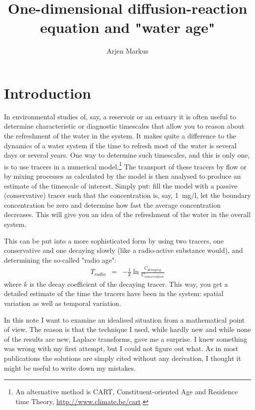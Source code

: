 \documentclass[onecolumn]{article}
\begin{document}
\title{One-dimensional diffusion-reaction equation and "water age"}

\author{Arjen Markus}

\maketitle

\section*{Introduction}
In environmental studies of, say, a reservoir or an estuary it is often useful to determine characteristic or diagnostic
timescales that allow you to reason about the refreshment of the water in the system. It makes quite a difference to
the dynamics of a water system if the time to refresh most of the water is several days or several years. One way to
determine such timescales, and this is only one, is to use tracers in a numerical model.\footnote{An alternative
method is CART, Constituent-oriented Age and Residence time Theory, \url{http://www.climate.be/cart}.}
 The transport of these
tracers by flow or by mixing processes as calculated by the model is then analysed to produce an estimate of the timescale
of interest. Simply put: fill the model with a passive (conservative) tracer such that the concentration is, say, 1~mg/l, let
the boundary concentration be zero and determine how fast the average concentration decreases. This will give you an idea
of the refreshment of the water in the overall system.

This can be put into a more sophisticated form by using two tracers, one conservative and one decaying slowly (like a radio-active
substance would), and determining the so-called "radio age":
\begin{eqnarray}
\label{radioage}
    T_{radio} &=& -\frac{1}{k} \ln \frac{C_{decaying}}{C_{conservative}}
\end{eqnarray}
%
\noindent where $k$ is the decay coefficient of the decaying tracer. This way, you get a detailed estimate of the time the
tracers have been in the system: spatial variation as well as temporal variation.

In this note I want to examine an idealised situation from a mathematical point of view. The reason is that the technique I
used, while hardly new and while none of the results are new, Laplace transforms, gave me a surprise. I knew something was
wrong with my first attempt, but I could not figure out what. As in most publications the solutions are simply cited without
any derivation, I thought it might be useful to write down my mistakes.
\end{document}
